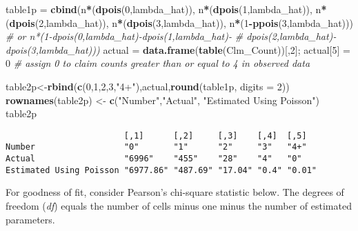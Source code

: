 \documentclass[]{book}
\newenvironment{Shaded}{\begin{snugshade}}{\end{snugshade}}
\newcommand{\KeywordTok}[1]{\textcolor[rgb]{0.13,0.29,0.53}{\textbf{#1}}}
\newcommand{\DataTypeTok}[1]{\textcolor[rgb]{0.13,0.29,0.53}{#1}}
\newcommand{\DecValTok}[1]{\textcolor[rgb]{0.00,0.00,0.81}{#1}}
\newcommand{\StringTok}[1]{\textcolor[rgb]{0.31,0.60,0.02}{#1}}
\newcommand{\CommentTok}[1]{\textcolor[rgb]{0.56,0.35,0.01}{\textit{#1}}}
\newcommand{\OperatorTok}[1]{\textcolor[rgb]{0.81,0.36,0.00}{\textbf{#1}}}
\newcommand{\NormalTok}[1]{#1}
\theoremstyle{definition}
\theoremstyle{definition}
\theoremstyle{definition}
\theoremstyle{remark}
\begin{document}
\begin{Shaded}
\begin{Highlighting}[]
\NormalTok{table1p =}\StringTok{ }\KeywordTok{cbind}\NormalTok{(n}\OperatorTok{*}\NormalTok{(}\KeywordTok{dpois}\NormalTok{(}\DecValTok{0}\NormalTok{,lambda_hat)),}
\NormalTok{                n}\OperatorTok{*}\NormalTok{(}\KeywordTok{dpois}\NormalTok{(}\DecValTok{1}\NormalTok{,lambda_hat)),}
\NormalTok{                n}\OperatorTok{*}\NormalTok{(}\KeywordTok{dpois}\NormalTok{(}\DecValTok{2}\NormalTok{,lambda_hat)),}
\NormalTok{                n}\OperatorTok{*}\NormalTok{(}\KeywordTok{dpois}\NormalTok{(}\DecValTok{3}\NormalTok{,lambda_hat)),}
\NormalTok{                n}\OperatorTok{*}\NormalTok{(}\DecValTok{1}\OperatorTok{-}\KeywordTok{ppois}\NormalTok{(}\DecValTok{3}\NormalTok{,lambda_hat))) }\CommentTok{# or n*(1-dpois(0,lambda_hat)-dpois(1,lambda_hat)-}
                                       \CommentTok{#     dpois(2,lambda_hat)-dpois(3,lambda_hat)))}
\NormalTok{actual =}\StringTok{ }\KeywordTok{data.frame}\NormalTok{(}\KeywordTok{table}\NormalTok{(Clm_Count))[,}\DecValTok{2}\NormalTok{];}
\NormalTok{actual[}\DecValTok{5}\NormalTok{] =}\StringTok{ }\DecValTok{0}  \CommentTok{# assign 0 to claim counts greater than or equal to 4 in observed data}

\NormalTok{table2p<-}\KeywordTok{rbind}\NormalTok{(}\KeywordTok{c}\NormalTok{(}\DecValTok{0}\NormalTok{,}\DecValTok{1}\NormalTok{,}\DecValTok{2}\NormalTok{,}\DecValTok{3}\NormalTok{,}\StringTok{"4+"}\NormalTok{),actual,}\KeywordTok{round}\NormalTok{(table1p, }\DataTypeTok{digits =} \DecValTok{2}\NormalTok{))}
\KeywordTok{rownames}\NormalTok{(table2p) <-}\StringTok{ }\KeywordTok{c}\NormalTok{(}\StringTok{"Number"}\NormalTok{,}\StringTok{"Actual"}\NormalTok{, }\StringTok{"Estimated Using Poisson"}\NormalTok{)}
\NormalTok{table2p}
\end{Highlighting}
\end{Shaded}

\begin{verbatim}
                        [,1]      [,2]     [,3]    [,4]  [,5]  
Number                  "0"       "1"      "2"     "3"   "4+"  
Actual                  "6996"    "455"    "28"    "4"   "0"   
Estimated Using Poisson "6977.86" "487.69" "17.04" "0.4" "0.01"
\end{verbatim}

For goodness of fit, consider Pearson's chi-square statistic below. The
degrees of freedom (\emph{df}) equals the number of cells minus one
minus the number of estimated parameters.
\end{document}
